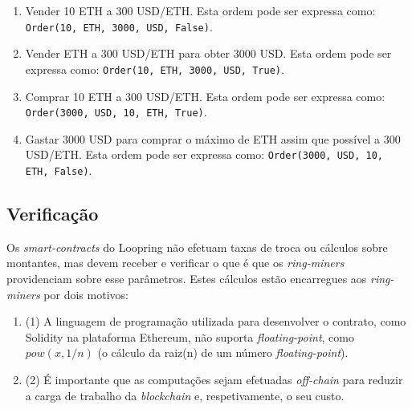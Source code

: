 \documentclass[UTF8,nofonts]{article}
\begin{document}
\begin{multicols}{2}
\begin{enumerate}
	\item Vender 10 ETH a 300 USD/ETH. Esta ordem pode ser expressa como: \verb|Order(10, ETH, 3000, USD, False)|.
	\item Vender  ETH a 300 USD/ETH para obter 3000 USD. Esta ordem pode ser expressa como: \verb|Order(10, ETH, 3000, USD, True)|.
	\item Comprar 10 ETH a 300 USD/ETH. Esta ordem pode ser expressa como: \verb|Order(3000, USD, 10, ETH, True)|.
	\item Gastar 3000 USD para comprar o máximo de ETH assim que possível a 300 USD/ETH. Esta ordem pode ser expressa como: \verb|Order(3000, USD, 10, ETH, False)|.
\end{enumerate}

\subsection{Verificação\label{sec:ring_verification}}


Os \textit{smart-contracts} do Loopring não efetuam taxas de troca ou cálculos sobre montantes, mas devem receber e verificar o que é que os \textit{ring-miners} providenciam sobre esse parâmetros. Estes cálculos estão encarregues aos \textit{ring-miners} por dois motivos:
\begin{enumerate}
  \item (1) A linguagem de programação utilizada para desenvolver o contrato, como Solidity\cite{dannen2017introducing} na plataforma Ethereum, não suporta \textit{floating-point}, como $pow(x, 1/n)$ (o cálculo da raiz(n) de um número \textit{floating-point}).
  \item (2) É importante que as computações sejam efetuadas \textit{off-chain} para reduzir a carga de trabalho da \textit{blockchain} e, respetivamente, o seu custo.


\end{enumerate}
\end{multicols}
\end{document}
